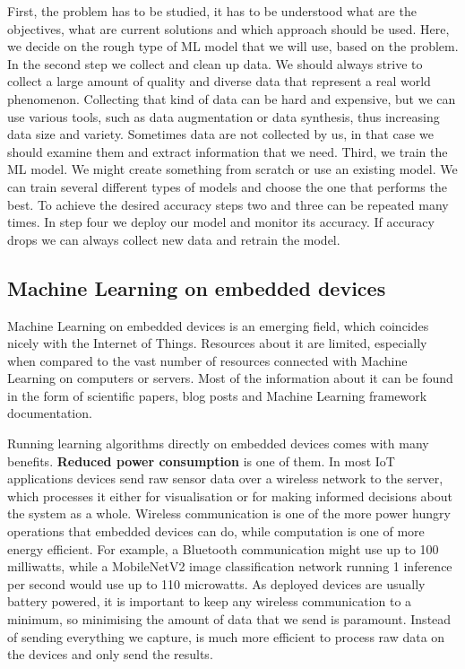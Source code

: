 First, the problem has to be studied, it has to be understood what are the objectives, what are current solutions and which approach should be used. 
Here, we decide on the rough type of ML model that we will use, based on the problem.
In the second step we collect and clean up data.
We should always strive to collect a large amount of quality and diverse data that represent a real world phenomenon.
Collecting that kind of data can be hard and expensive, but we can use various tools, such as data augmentation or data synthesis, thus increasing data size and variety.
Sometimes data are not collected by us, in that case we should examine them and extract information that we need.
Third, we train the ML model.
We might create something from scratch or use an existing model. 
We can train several different types of models and choose the one that performs the best.
To achieve the desired accuracy steps two and three can be repeated many times.
In step four we deploy our model and monitor its accuracy. 
If accuracy drops we can always collect new data and retrain the model.


\subsection{ Machine Learning on embedded devices} \label{ml_on_embedded}

Machine Learning on embedded devices is an emerging field, which coincides nicely with the Internet of Things.
Resources about it are limited, especially when compared to the vast number of resources connected with Machine Learning on computers or servers.
Most of the information about it can be found in the form of scientific papers, blog posts and Machine Learning framework documentation\cite{hello_edge}\cite{tflite_risc-v}\cite{pete_tiny}.

Running learning algorithms directly on embedded devices comes with many benefits.
\textbf{Reduced power consumption} is one of them.
In most IoT applications devices send raw sensor data over a wireless network to the server, which processes it either for visualisation or for making informed decisions about the system as a whole. 
Wireless communication is one of the more power hungry operations that embedded devices can do, while computation is one of more energy efficient\cite{pete_tiny}.
For example, a Bluetooth communication might use up to 100 milliwatts, while a MobileNetV2 image classification network running 1 inference per second would use up to 110 microwatts\cite{pete_tiny}.
As deployed devices are usually battery powered, it is important to keep any wireless communication to a minimum, so minimising the amount of data that we send is paramount.
Instead of sending everything we capture, is much more efficient to process raw data on the devices and only send the results.

